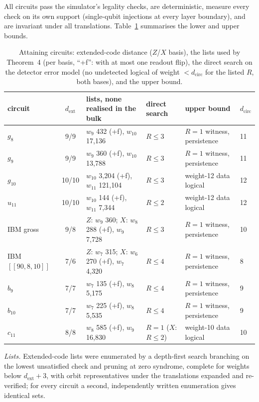 \documentclass[aps,prl,twocolumn,superscriptaddress,nofootinbib]{revtex4-2}
\newcommand{\dcirc}{d_{\mathrm{circ}}}
\newcommand{\dext}{d_{\mathrm{ext}}}
\newcommand{\code}[1]{[[#1]]}
\begin{document}
All circuits pass the simulator's legality checks, are deterministic, measure every check on
its own support (single-qubit injections at every layer boundary), and are invariant under
all translations. Table~\ref{tab:attain} summarises the lower and upper bounds.

\begin{table}[h]
\caption{Attaining circuits: extended-code distance ($Z$/$X$ basis), the lists used by
Theorem~4 (per basis, ``+f'': with at most one readout flip), the direct search on the
detector error model (no undetected logical of weight $<\dcirc$ for the listed $R$, both
bases), and the upper bound.}
\label{tab:attain}
\begin{ruledtabular}
\begin{tabular}{lcllll}
circuit & $\dext$ & lists, none realised in the bulk & direct search & upper bound & $\dcirc$\\
\hline
$g_8$ & 9/9 & $w_9$ 432 (+f), $w_{10}$ 17,136 & $R\le3$ & $R=1$ witness, persistence & 11\\
$g_9$ & 9/9 & $w_9$ 360 (+f), $w_{10}$ 13,788 & $R\le3$ & $R=1$ witness, persistence & 11\\
$g_{10}$ & 10/10 & $w_{10}$ 3,204 (+f), $w_{11}$ 121,104 & $R\le3$ & weight-12 data logical & 12\\
$u_{11}$ & 10/10 & $w_{10}$ 144 (+f), $w_{11}$ 7,344 & $R\le2$ & weight-12 data logical & 12\\
IBM gross & 9/8 & $Z$: $w_9$ 360; $X$: $w_8$ 288 (+f), $w_9$ 7,728 & $R\le3$ & $R=1$ witness, persistence & 10\\
IBM $\code{90,8,10}$ & 7/6 & $Z$: $w_7$ 315; $X$: $w_6$ 270 (+f), $w_7$ 4,320 & $R\le4$ & $R=1$ witness, persistence & 8\\
$b_9$ & 7/7 & $w_7$ 135 (+f), $w_8$ 5,175 & $R\le4$ & $R=1$ witness, persistence & 9\\
$b_{10}$ & 7/7 & $w_7$ 225 (+f), $w_8$ 5,535 & $R\le4$ & $R=1$ witness, persistence & 9\\
$c_{11}$ & 8/8 & $w_8$ 585 (+f), $w_9$ 16,830 & $R=1$ ($X$: $R\le2$) & weight-10 data logical & 10\\
\end{tabular}
\end{ruledtabular}
\end{table}

\emph{Lists.} Extended-code lists were enumerated by a depth-first search branching on the
lowest unsatisfied check and pruning at zero syndrome, complete for weights below
$\dext+3$, with orbit representatives under the translations expanded and re-verified; for
every circuit a second, independently written enumeration gives identical sets.
\end{document}
